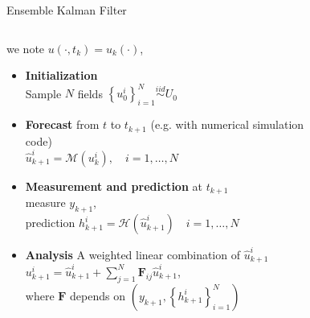 \documentclass[aspectratio=169]{beamer} %
\begin{document}
\begin{frame}{Ensemble Kalman Filter}
    \begin{columns}
        \begin{column}{0.6\textwidth}
            \small
            we note $u(\cdot, t_{k}) = u_k(\cdot)$,
            \begin{itemize}
                \item<1-> \textbf{Initialization} \\
                    Sample $N$ fields $\left\{u^i_0\right\}_{i=1}^N \stackrel{iid}{\sim} U_0$
                    \vfill
                \item<2-> \textbf{Forecast} from $t$ to $t_{k+1}$ (e.g. with numerical simulation code) \\
                    $\hat u^i_{k+1} = \mathcal M(u_k^i), \quad i = 1, \dots, N$
                    \vfill
                \item<3-> \textbf{Measurement and prediction} at $t_{k+1}$\\
                    measure $y_{k+1}$, \\
                    prediction $h^i_{k+1} = \mathcal H (\hat u^i_{k+1}) \quad i = 1, \dots, N$
                    \vfill
                \item<4-> \textbf{Analysis} A weighted linear combination of $\hat u_{k+1}^i$ \\
                    $u^i_{k+1} = \hat u^i_{k+1} + \sum_{j=1}^N \bm F_{ij} \hat u^i_{k+1}$, \\ where $\bm F$ depends on $\left(y_{k+1}, \left\{h^i_{k+1}\right\}_{i=1}^N\right)$\footnotemark[1]
            \end{itemize}
        \end{column}
        \begin{column}{0.4\textwidth}
            \begin{figure}
                \centering

\end{figure}
\end{column}
\end{columns}
\end{frame}
\end{document}
